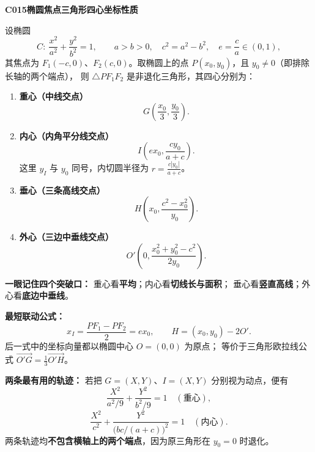 \begin{statementbox}
\textbf{C015\quad 椭圆焦点三角形四心坐标性质}

设椭圆
\[
 C:\ \frac{x^2}{a^2}+\frac{y^2}{b^2}=1,
 \qquad a>b>0,\quad c^2=a^2-b^2,\quad e=\frac ca\in(0,1),
\]
其焦点为 $F_1(-c,0)$、$F_2(c,0)$。取椭圆上的点
$P(x_0,y_0)$，且 $y_0\ne0$（即排除长轴的两个端点），
则 $\triangle PF_1F_2$ 是非退化三角形，其四心分别为：
\begin{enumerate}
 \item \textbf{重心（中线交点）}
 \[
 \boxed{G\left(\frac{x_0}{3},\frac{y_0}{3}\right)}.
 \]
 \item \textbf{内心（内角平分线交点）}
 \[
 \boxed{I\left(ex_0,\frac{cy_0}{a+c}\right)}.
 \]
 这里 $y_I$ 与 $y_0$ 同号，内切圆半径为
 $\displaystyle r=\frac{c|y_0|}{a+c}$。
 \item \textbf{垂心（三条高线交点）}
 \[
 \boxed{H\left(x_0,\frac{c^2-x_0^2}{y_0}\right)}.
 \]
 \item \textbf{外心（三边中垂线交点）}
 \[
 \boxed{O'\left(0,\frac{x_0^2+y_0^2-c^2}{2y_0}\right)}.
 \]
\end{enumerate}

\textbf{一眼记住四个突破口：}
重心看\textbf{平均}；内心看\textbf{切线长与面积}；
垂心看\textbf{竖直高线}；外心看\textbf{底边中垂线}。

\textbf{最短联动公式：}
\[
 \boxed{x_I=\frac{PF_1-PF_2}{2}=ex_0},\qquad
 \boxed{H=(x_0,y_0)-2O'}.
\]
后一式中的坐标向量都以椭圆中心 $O=(0,0)$ 为原点；
等价于三角形欧拉线公式 $\overrightarrow{O'G}=\tfrac13\overrightarrow{O'H}$。

\textbf{两条最有用的轨迹：}
若把 $G=(X,Y)$、$I=(X,Y)$ 分别视为动点，便有
\[
 \boxed{\frac{X^2}{a^2/9}+\frac{Y^2}{b^2/9}=1}
 \quad(\text{重心}),
\]
\[
 \boxed{\frac{X^2}{c^2}+
 \frac{Y^2}{\bigl(bc/(a+c)\bigr)^2}=1}
 \quad(\text{内心}).
\]
两条轨迹均\textbf{不包含横轴上的两个端点}，因为原三角形在 $y_0=0$ 时退化。
\end{statementbox}
